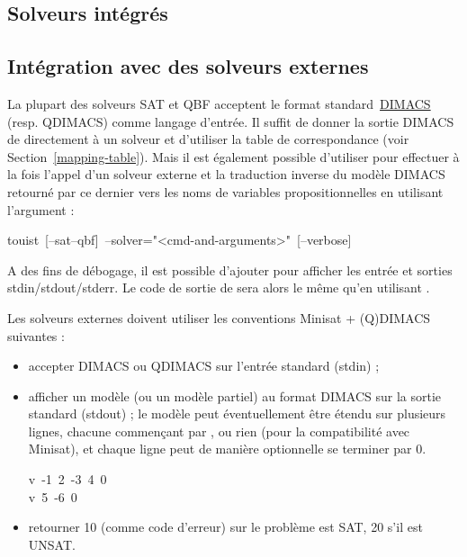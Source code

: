 %
%
\subsection{Solveurs intégrés}


%
%
\subsection{Intégration avec des solveurs externes}

\noindent La plupart des solveurs SAT et QBF acceptent le format standard~\href{http://www.satcompetition.org/2009/format-benchmarks2009.html}{DIMACS} (resp.
QDIMACS) comme langage d'entrée. Il suffit de donner la sortie DIMACS de \touist directement à un solveur et d'utiliser la table de correspondance (voir Section~\ref{mapping-table}).
Mais il est également possible d'utiliser \touist pour effectuer à la fois l'appel d'un solveur externe et la traduction inverse du modèle DIMACS retourné par ce dernier vers les noms de variables propositionnelles en utilisant l'argument :%
\begin{footnotesize}
\begin{mdpre}%
\noindent{}touist~{}[--sat\textbar{}--qbf]~--solver="\textless{}cmd-and-arguments\textgreater{}"~{}[--verbose]%
\end{mdpre}
\end{footnotesize}
\noindent A des fins de débogage, il est possible d'ajouter  pour afficher les entrée et sorties stdin/stdout/stderr.
Le code de sortie de \touist sera alors le même qu'en utilisant .

Les solveurs externes doivent utiliser les conventions Minisat + (Q)DIMACS suivantes :
\begin{itemize}
    \item accepter DIMACS ou QDIMACS sur l'entrée standard (stdin) ;
    \item afficher un modèle (ou un modèle partiel) au format DIMACS sur la sortie standard (stdout) ; le modèle peut éventuellement être étendu sur plusieurs lignes, chacune commençant par ,  ou rien (pour la compatibilité avec Minisat), et chaque ligne peut de manière optionnelle se terminer par 0.
\begin{footnotesize}
\begin{mdpre}%
\noindent{}v~-1~2~-3~4~0\\
v~5~-6~0%
\end{mdpre}
\end{footnotesize}

\item retourner 10 (comme code d'erreur) sur le problème est SAT, 20 s'il est UNSAT.%
\end{itemize}%


